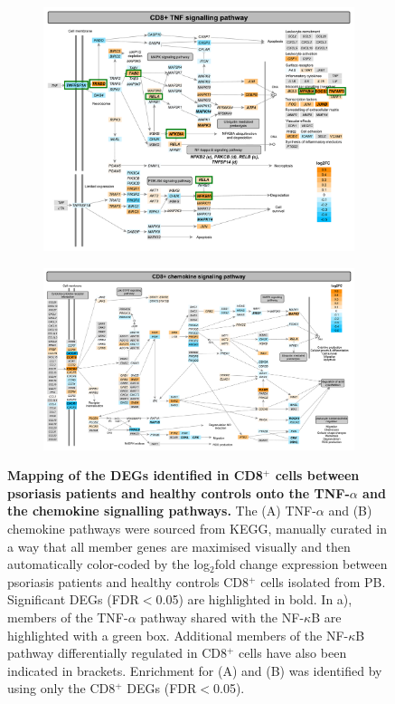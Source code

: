 \begin{figure}[htbp]
\centering
\begin{subfigure}{0.8\textwidth}
\centering
\includegraphics[width=\textwidth]{./Results2/pdfs/PS_CTL_CD8_all_TNF_pathway}
\caption{\textbf{}}
\end{subfigure}
\begin{subfigure}{0.8 \textwidth}
\centering
\includegraphics[width=\textwidth]{./Results2/pdfs/PS_CTL_CD8_all_chemokine_pathway}
\caption{\textbf{}}
\end{subfigure}
\caption[Mapping of the DEGs identified in CD8$^+$ cells between psoriasis patients and healthy controls onto the TNF-$\alpha$ and the chemokine signalling pathways.]{\textbf{Mapping of the DEGs identified in CD8$^+$ cells between psoriasis patients and healthy controls onto the TNF-$\alpha$ and the chemokine signalling pathways.} The (A) TNF-$\alpha$ and (B) chemokine pathways were sourced from KEGG, manually curated in a way that all member genes are maximised visually and then automatically color-coded by the log$_2$fold change expression between psoriasis patients and healthy controls CD8$^+$ cells isolated from PB. Significant DEGs (FDR$<$0.05) are highlighted in bold. In a), members of the TNF-$\alpha$ pathway shared with the NF-$\kappa$B are highlighted with a green box. Additional members of the NF-$\kappa$B pathway differentially regulated in CD8$^+$ cells have also been indicated in brackets. Enrichment for (A) and (B) was identified by using only the CD8$^+$ DEGs (FDR$<$0.05).}

\end{figure}
